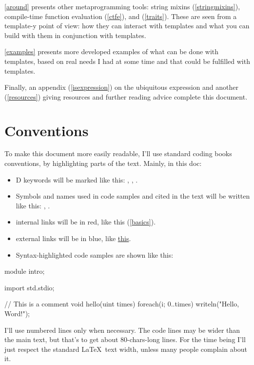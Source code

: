 \autoref{around} presents other meta\-pro\-gram\-ming tools: string mixins (\ref{stringmixins}), compile-time function evaluation (\ref{ctfe}), and  (\ref{traits}). These are seen from a \mbox{template-y} point of view: how they can interact with templates and what you can build with them in conjunction with templates.

\autoref{examples} presents more developed examples of what can be done with templates, based on real needs I had at some time and that could be fulfilled with templates.

Finally, an appendix (\autoref{isexpression}) on the ubiquitous  expression  and another (\ref{resources}) giving resources and further reading advice complete this document.

\section*{Conventions}\label{conventions}

To make this document more easily readable, I'll use standard coding books conventions, by highlighting parts of the text. Mainly, in this doc:

\begin{itemize}
\item D keywords will be marked like this: , , .
\item Symbols and names used in code samples and cited in the text will be written like this: , .
\item internal links will be in red, like this (\ref{basics}).
\item external links will be in blue, like \href{http://www.dlang.org}{this}.
\item Syntax-highlighted code samples are shown like this:
\end{itemize}

\begin{ndcode}
module intro;

import std.stdio;

// This is a comment
void hello(uint times)
{
    foreach(i; 0..times) writeln("Hello, Word!");
}
\end{ndcode}

I'll use numbered lines only when necessary. The code lines may be wider than the main text, but that's to get about 80-chars-long lines. For the time being I'll just respect the standard \LaTeX\ text width, unless many people complain about it.

